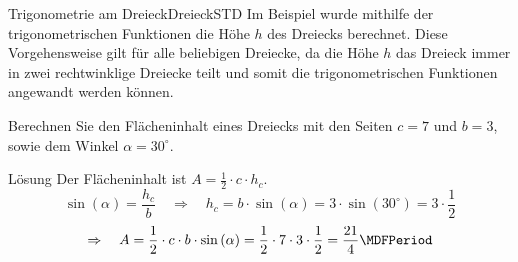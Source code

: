 \begin{MXContent}{Trigonometrie am Dreieck}{Dreieck}{STD}
Im Beispiel  wurde mithilfe der trigonometrischen Funktionen die H\"ohe $h$ des Dreiecks berechnet. Diese Vorgehensweise gilt f\"ur alle beliebigen Dreiecke, da die H\"ohe $h$ das Dreieck immer in zwei rechtwinklige Dreiecke teilt und somit die trigonometrischen Funktionen angewandt werden k\"onnen.

\begin{MExercise}
Berechnen Sie den Fl\"acheninhalt eines Dreiecks mit den Seiten $c=7$ und $b=3$, sowie dem Winkel $\alpha=30^\circ$.

\begin{MHint}{L\"osung}
Der Fl\"acheninhalt ist $A=\frac{1}{2}\cdot c \cdot h_c$.
\[\sin\left(\alpha\right)=\frac{h_c}{b}\quad\Rightarrow\quad h_c=b\cdot\sin\left(\alpha\right)=3\cdot\sin\left(30^\circ\right)= 3\cdot\frac{1}{2}\]
\[\Rightarrow\quad A=\frac{1}{2}\cdot c\cdot b\cdot\sin\left(\alpha\right)=\frac{1}{2}\cdot 7 \cdot3\cdot\frac{1}{2}=\frac{21}{4} \MDFPeriod\]
\end{MHint}
\end{MExercise}

\end{MXContent}


